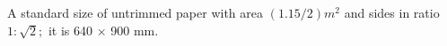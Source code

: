 A standard size of untrimmed paper with area $(1.15/2)m^{2}$  and sides in ratio
$ 1 : \sqrt{2} ; $ it is 640 \ensuremath{ \times } 900 mm.